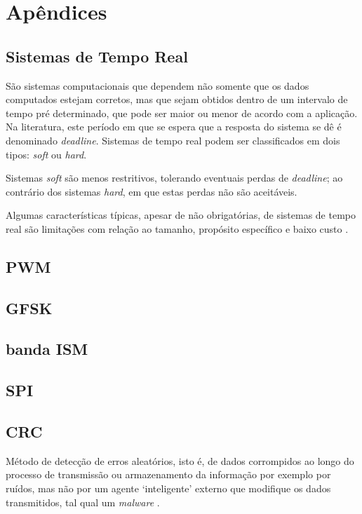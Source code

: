 \chapter{Apêndices}

\section{Sistemas de Tempo Real}
São sistemas computacionais que dependem não somente que os dados computados estejam corretos, mas que sejam obtidos dentro de um intervalo de tempo 
pré determinado, que pode ser maior ou menor de acordo com a aplicação.
Na literatura, este período em que se espera que a resposta do sistema se dê é denominado \textit{deadline}.
Sistemas de tempo real podem ser classificados em dois tipos: \textit{soft} ou \textit{hard}.

Sistemas \textit{soft} são menos restritivos, tolerando eventuais perdas de \textit{deadline}; 
ao contrário dos sistemas \textit{hard}, em que estas perdas não são aceitáveis.  

Algumas características típicas, apesar de não obrigatórias, de sistemas de tempo real são limitações com relação ao tamanho, propósito específico e 
baixo custo \cite{silberschatz}.

\section{PWM}

\section{GFSK}

\section{banda ISM}

\section{SPI}

\section{CRC}
Método de detecção de erros aleatórios, isto é, de dados corrompidos ao longo do processo de transmissão ou armazenamento da informação por exemplo 
por ruídos, mas não por um agente \textquoteleft inteligente\textquoteright{} externo que modifique os dados transmitidos, tal qual um 
\textit{malware} \cite{stigge}.

